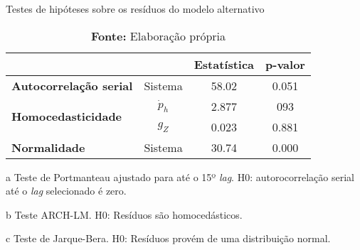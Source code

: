 \begin{table}[H]
\centering
\caption{Testes de hipóteses sobre os resíduos do modelo alternativo}
\label{testes_resduos}
	\begin{threeparttable}
\begin{tabular}{l|c|c|c}
\hline
\multicolumn{2}{l|}{} & \textbf{Estatística} & \textbf{p-valor} \\ \hline
\textbf{Autocorrelação serial}\tnote{a} & Sistema & 58.02 & 0.051 \\ \hline
\multirow{2}{*}{\textbf{Homocedasticidade}\tnote{b}} & $\dot p_h$ & 2.877 & 093 \\ \cline{2-4} 
 & $g_Z$ & 0.023 & 0.881 \\ \hline
\textbf{Normalidade}\tnote{c} & Sistema & 30.74 & 0.000 \\ \hline
\end{tabular}%
\begin{tablenotes}\footnotesize
	\item [a] Teste de Portmanteau ajustado para até o 15º \textit{lag}. H0: autorocorrelação serial até o \textit{lag} selecionado é zero.
	\item [b] Teste ARCH-LM. H0: Resíduos são homocedásticos.
	\item [c] Teste de Jarque-Bera. H0: Resíduos provém de uma distribuição normal.
\end{tablenotes}
\end{threeparttable}
\caption*{\textbf{Fonte:} Elaboração própria}
\end{table}